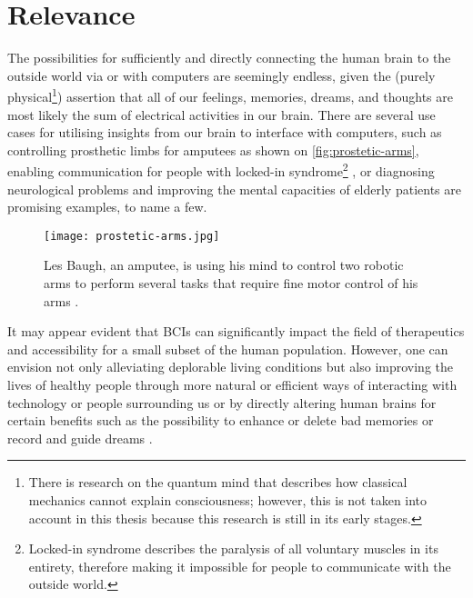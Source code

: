 \section{Relevance}
\label{chapter1-relevance}

The possibilities for sufficiently and directly connecting the human brain to the outside world via or with computers are seemingly endless, given the (purely physical\footnote{There is research on the quantum mind that describes how classical mechanics cannot explain consciousness; however, this is not taken into account in this thesis because this research is still in its early stages.}) assertion that all of our feelings, memories, dreams, and thoughts are most likely the sum of electrical activities in our brain. There are several use cases for utilising insights from our brain to interface with computers, such as controlling prosthetic limbs for amputees \citep{campbell_amputee_2014} as shown on \autoref{fig:prostetic-arms}, enabling communication for people with locked-in syndrome\footnote{Locked-in syndrome describes the paralysis of all voluntary muscles in its entirety, therefore making it impossible for people to communicate with the outside world.} \citep{chaudhary_spelling_2022}, or diagnosing neurological problems and improving the mental capacities of elderly patients \citep{belkacem_brain_2020} are promising examples, to name a few.

\begin{figure}[ht]
  \centering
  \texttt{[image: prostetic-arms.jpg]}
  \caption[Les Baugh, an amputee, is using his mind to control two robotic arms to perform several tasks that require fine motor control of his arms]{Les Baugh, an amputee, is using his mind to control two robotic arms to perform several tasks that require fine motor control of his arms \citep{campbell_amputee_2014}.}
  \label{fig:prostetic-arms}
\end{figure}

It may appear evident that BCIs can significantly impact the field of therapeutics and accessibility for a small subset of the human population. However, one can envision not only alleviating deplorable living conditions but also improving the lives of healthy people through more natural or efficient ways of interacting with technology or people surrounding us or by directly altering human brains for certain benefits such as the possibility to enhance or delete bad memories \citep{spiers_enhance_2014} or record and guide dreams \citep{haar_horowitz_dormio_2020}.

